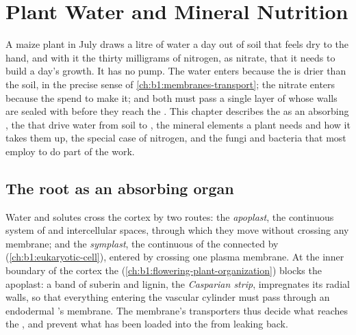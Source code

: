 \chapter{Plant Water and Mineral Nutrition}\label{ch:b1:plant-water-minerals}

A maize plant in July draws a litre of water a day out of soil that
feels dry to the hand, and with it the thirty milligrams of nitrogen,
as nitrate, that it needs to build a day's growth. It has no pump. The
water enters because the  is drier than the soil, in the precise
sense of \cref{ch:b1:membranes-transport}; the nitrate enters because
the   spend  to make it; and both must pass a single layer
of  whose walls are sealed with  before they reach the .
This chapter describes the  as an absorbing , the  that drive water from soil to , the mineral elements a
plant needs and how it takes them up, the special case of nitrogen,
and the fungi and bacteria that most  employ to do part of the
work.

\section{The root as an absorbing organ}

\begin{definition}\label{def:b1:plant-water-minerals:pathways}
Water and solutes cross the  cortex by two routes: the
\emph{apoplast}, the continuous system of  and intercellular
spaces, through which they move without crossing any membrane; and the
\emph{symplast}, the continuous  of the  connected by
 (\cref{ch:b1:eukaryotic-cell}), entered by crossing one
plasma membrane. At the inner boundary of the cortex the
\emph{} (\cref{ch:b1:flowering-plant-organization}) blocks the
apoplast: a band of suberin and lignin, the \emph{Casparian strip},
impregnates its radial walls, so that everything entering the
vascular cylinder must pass through an endodermal 's membrane. The
membrane's transporters thus decide what reaches the , and
prevent what has been loaded into the  from leaking back.
\end{definition}

